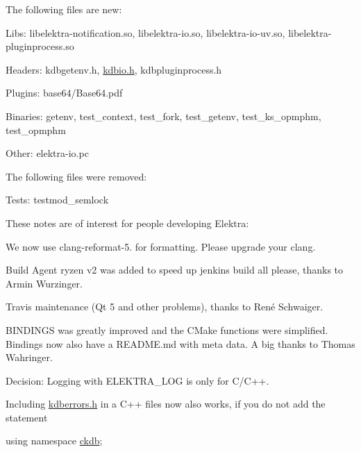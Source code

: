 The following files are new\+:


\begin{DoxyItemize}
\item Libs\+: {\ttfamily libelektra-\/notification.\+so}, {\ttfamily libelektra-\/io.\+so}, {\ttfamily libelektra-\/io-\/uv.\+so}, {\ttfamily libelektra-\/pluginprocess.\+so}
\item Headers\+: {\ttfamily kdbgetenv.\+h}, {\ttfamily \hyperlink{kdbio_8h}{kdbio.\+h}}, {\ttfamily kdbpluginprocess.\+h}
\item Plugins\+: {\ttfamily base64/\+Base64.\+pdf}
\item Binaries\+: {\ttfamily getenv}, {\ttfamily test\+\_\+context}, {\ttfamily test\+\_\+fork}, {\ttfamily test\+\_\+getenv}, {\ttfamily test\+\_\+ks\+\_\+opmphm}, {\ttfamily test\+\_\+opmphm}
\item Other\+: {\ttfamily elektra-\/io.\+pc}
\end{DoxyItemize}

The following files were removed\+:


\begin{DoxyItemize}
\item Tests\+: {\ttfamily testmod\+\_\+semlock}
\end{DoxyItemize}

These notes are of interest for people developing Elektra\+:


\begin{DoxyItemize}
\item We now use {\ttfamily clang-\/reformat-\/5.} for formatting. Please upgrade your clang.
\item Build Agent {\ttfamily ryzen v2} was added to speed up {\ttfamily jenkins build all please}, thanks to Armin Wurzinger.
\item Travis maintenance (Qt 5 and other problems), thanks to René Schwaiger.
\item {\ttfamily B\+I\+N\+D\+I\+N\+GS} was greatly improved and the C\+Make functions were simplified. Bindings now also have a {\ttfamily R\+E\+A\+D\+M\+E.\+md} with meta data. A big thanks to Thomas Wahringer.
\item Decision\+: Logging with {\ttfamily E\+L\+E\+K\+T\+R\+A\+\_\+\+L\+OG} is only for C/\+C++.
\item Including {\ttfamily \hyperlink{kdberrors_8h}{kdberrors.\+h}} in a C++ files now also works, if you do not add the statement
\end{DoxyItemize}


\begin{DoxyCode}
\textcolor{keyword}{using namespace }\hyperlink{namespaceckdb}{ckdb};
\end{DoxyCode}


